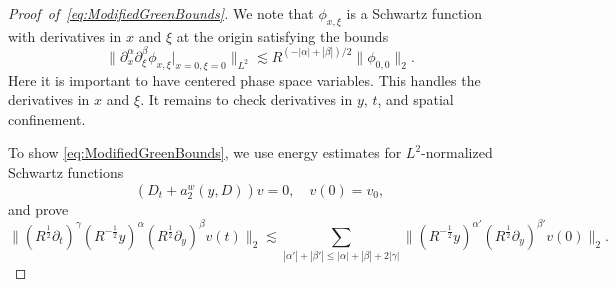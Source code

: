 \documentclass{amsart}
\theoremstyle{definition}
\begin{document}
\begin{proof}[Proof~of~\eqref{eq:ModifiedGreenBounds}]
We note that $\phi_{x,\xi}$ is a Schwartz function with derivatives in $x$ and $\xi$ at the origin satisfying the bounds
\begin{equation*}
\| \partial_x^{\alpha} \partial_{\xi}^{\beta} \phi_{x,\xi} \vert_{x=0,\xi=0} \|_{L^2} \lesssim R^{(-|\alpha|+|\beta|)/2} \| \phi_{0,0} \|_2.
\end{equation*}
Here it is important to have centered phase space variables. This handles the derivatives in $x$ and $\xi$. It remains to check derivatives in $y$, $t$, and spatial confinement.

To show \eqref{eq:ModifiedGreenBounds}, we use energy estimates for $L^2$-normalized Schwartz functions
\begin{equation*}
(D_t + a_2^w(y,D)) v = 0, \quad v(0) = v_0,
\end{equation*}
and prove
\begin{equation*}
\| (R^{\frac{1}{2}} \partial_t)^{\gamma} (R^{-\frac{1}{2}} y)^{\alpha} (R^{\frac{1}{2}} \partial_y)^{\beta} v(t) \|_2 \lesssim \sum_{|\alpha'| + |\beta'| \leq |\alpha| + |\beta| + 2 |\gamma|} \| (R^{-\frac{1}{2}} y)^{\alpha'} (R^{\frac{1}{2}} \partial_y)^{\beta'} v(0) \|_2.
\end{equation*}


\end{proof}
\end{document}
